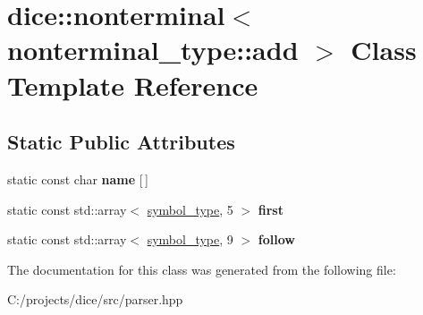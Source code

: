 \hypertarget{classdice_1_1nonterminal_3_01nonterminal__type_1_1add_01_4}{}\section{dice\+:\+:nonterminal$<$ nonterminal\+\_\+type\+:\+:add $>$ Class Template Reference}
\label{classdice_1_1nonterminal_3_01nonterminal__type_1_1add_01_4}
\subsection*{Static Public Attributes}
\begin{DoxyCompactItemize}
\item 
\mbox{\label{classdice_1_1nonterminal_3_01nonterminal__type_1_1add_01_4_a3b40b9a88563652e016b15406f4fe7f7}} 
static const char {\bfseries name} \mbox{[}$\,$\mbox{]}
\item 
\mbox{\label{classdice_1_1nonterminal_3_01nonterminal__type_1_1add_01_4_adb8cb5488ce6c11ff3025419bafd9515}} 
static const std\+::array$<$ \mbox{\hyperlink{symbols_8hpp_ab0295a855bb7eadc138abd6993af3aea}{symbol\+\_\+type}}, 5 $>$ {\bfseries first}
\item 
\mbox{\label{classdice_1_1nonterminal_3_01nonterminal__type_1_1add_01_4_aa1cf8e132ca8cfa99eba81d526eae9c0}} 
static const std\+::array$<$ \mbox{\hyperlink{symbols_8hpp_ab0295a855bb7eadc138abd6993af3aea}{symbol\+\_\+type}}, 9 $>$ {\bfseries follow}
\end{DoxyCompactItemize}


The documentation for this class was generated from the following file\+:\begin{DoxyCompactItemize}
\item 
C\+:/projects/dice/src/parser.\+hpp\end{DoxyCompactItemize}
